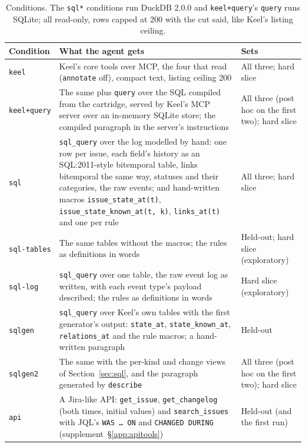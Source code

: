 \documentclass[sigconf, nonacm]{acmart}
\newcommand{\code}[1]{\texttt{#1}}
\begin{document}
\begin{table}[t]
\caption{Conditions. The \code{sql*} conditions run DuckDB 2.0.0 and \code{keel+query}'s \code{query} runs SQLite; all read-only, rows capped at 200 with the cut said, like Keel's listing ceiling.}
\label{tab:conditions}
\centering
\footnotesize
\begin{tabularx}{\textwidth}{P{0.75in} L P{1.5in}}
\toprule
Condition & What the agent gets & Sets \\
\midrule
\code{keel} & Keel's core tools over MCP, the four that read (\code{annotate} off), compact text, listing ceiling 200 & All three; hard slice \\
\code{keel+query} & The same plus \code{query} over the SQL compiled from the cartridge, served by Keel's MCP server over an in-memory SQLite store; the compiled paragraph in the server's instructions & All three (post hoc on the first two); hard slice \\
\code{sql} & \code{sql\_query} over the log modelled by hand: one row per issue, each field's history as an SQL:2011-style bitemporal table, links bitemporal the same way, statuses and their categories, the raw events; and hand-written macros \code{issue\_state\_at(t)}, \code{issue\_state\_known\_at(t, k)}, \code{links\_at(t)} and one per rule & All three; hard slice \\
\code{sql-tables} & The same tables without the macros; the rules as definitions in words & Held-out; hard slice (exploratory) \\
\code{sql-log} & \code{sql\_query} over one table, the raw event log as written, with each event type's payload described; the rules as definitions in words & Hard slice (exploratory) \\
\code{sqlgen} & \code{sql\_query} over Keel's own tables with the first generator's output: \code{state\_at}, \code{state\_known\_at}, \code{relations\_at} and the rule macros; a hand-written paragraph & Held-out \\
\code{sqlgen2} & The same with the per-kind and change views of Section~\ref{sec:sql}, and the paragraph generated by \code{describe} & All three (post hoc on the first two); hard slice \\
\code{api} & A Jira-like API: \code{get\_issue}, \code{get\_changelog} (both times, initial values) and \code{search\_issues} with JQL's \code{WAS\,\ldots\,ON} and \code{CHANGED DURING} (supplement~\S\ref{app:apitools}) & Held-out (and the first run) \\
\bottomrule
\end{tabularx}
\end{table}
\end{document}
